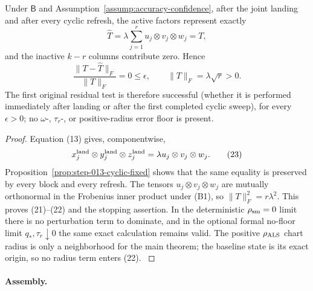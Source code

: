 \begin{proposition}\label{prop:step-013-zero-residual}
Under \(\mathsf B\) and
Assumption~\ref{assump:accuracy-confidence}, after the joint landing and
after every cyclic refresh, the active factors represent exactly
\[
\widehat T
=\lambda\sum_{j=1}^r u_j\otimes v_j\otimes w_j=T,
\tag{21}
\]
and the inactive \(k-r\) columns contribute zero. Hence
\[
\frac{\|T-\widehat T\|_F}{\|T\|_F}=0\le\epsilon,\qquad
\|T\|_F=\lambda\sqrt r>0.
\tag{22}
\]
The first original residual test is therefore successful (whether it is
performed immediately after landing or after the first completed cyclic
sweep), for every \(\epsilon>0\); no \(\omega\)-, \(\tau_r\)-, or positive-radius
error floor is present.

\begin{proof}
Equation (13) gives, componentwise,
\[
x_j^{\rm land}\otimes y_j^{\rm land}\otimes z_j^{\rm land}
=\lambda u_j\otimes v_j\otimes w_j.
\tag{23}
\]
Proposition~\ref{prop:step-013-cyclic-fixed} shows that the same equality is
preserved by every block and every refresh. The tensors
\(u_j\otimes v_j\otimes w_j\) are mutually orthonormal in the Frobenius inner
product under (B1), so \(\|T\|_F^2=r\lambda^2\). This proves (21)--(22) and
the stopping assertion. In the deterministic \(\rho_{\rm sm}=0\) limit
there is no perturbation term to dominate, and in the optional formal
no-floor limit \(q_*,\tau_r\downarrow0\) the same exact calculation remains
valid. The positive \(\rho_{\rm ALS}\) chart radius is only a neighborhood
for the main theorem; the baseline state is its exact origin, so no radius
term enters (22).
\(\)

\end{proof}
\end{proposition}
\paragraph{Assembly.}

